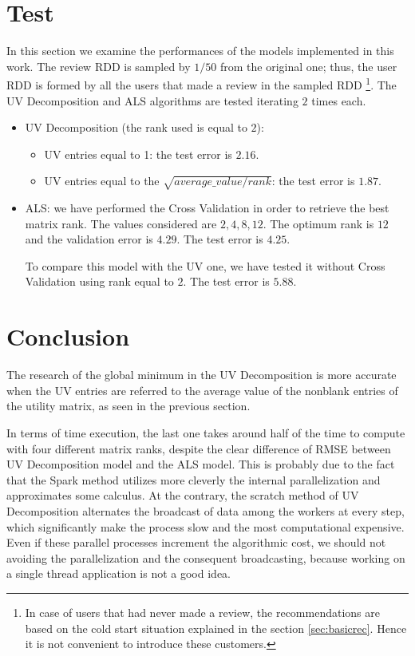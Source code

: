 \documentclass{article}
\begin{document}
\section{Test}
In this section we examine the performances of the models implemented in this work. The review RDD is sampled by $1/50$ from the original one; thus, the user RDD is formed by all the users that made a review in the sampled RDD \footnote{In case of users that had never made a review, the recommendations are based on the cold start situation explained in the section \ref{sec:basicrec}. Hence it is not convenient to introduce these customers.}. The UV Decomposition and ALS algorithms are tested iterating $2$ times each.  
\begin{itemize}
    \item UV Decomposition (the rank used is equal to $2$): 
    \begin{itemize}
        \item UV entries equal to 1: the test error is $2.16$.
        \item UV entries equal to the $\sqrt{average\_value/rank}$: the test error is $1.87$.
    \end{itemize}
    
    \item ALS: we have performed the Cross Validation in order to retrieve the best matrix rank. The values considered are $2, 4, 8, 12$. The optimum rank is $12$ and the validation error is $4.29$. The test error is $4.25$.
    
    To compare this model with the UV one, we have tested it without Cross Validation using rank equal to $2$. The test error is $5.88$.
\end{itemize}

\section{Conclusion}
The research of the global minimum in the UV Decomposition is more accurate when the UV entries are referred to the average value of the nonblank entries of the utility matrix, as seen in the previous section. 

In terms of time execution, the last one takes around half of the time to compute with four different matrix ranks, despite the clear difference of RMSE between UV Decomposition model and the ALS model. This is probably due to the fact that the Spark method utilizes more cleverly the internal parallelization and approximates some calculus. At the contrary, the scratch method of UV Decomposition alternates the broadcast of data among the workers at every step, which significantly make the process slow and the most computational expensive.
Even if these parallel processes increment the algorithmic cost, we should not avoiding the parallelization and the consequent broadcasting, because working on a single thread application is not a good idea. 
\end{document}
